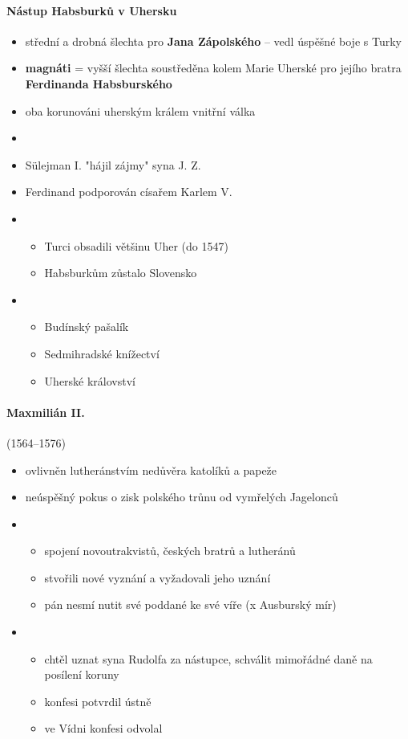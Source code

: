 \paragraph{Nástup Habsburků v Uhersku}
\begin{itemize}
\item střední a drobná šlechta pro \textbf{Jana Zápolského} -- vedl úspěšné boje s Turky
\item \textbf{magnáti} = vyšší šlechta soustředěna kolem Marie Uherské \ra pro jejího bratra \textbf{Ferdinanda Habsburského}
\item oba korunováni uherským králem \ra vnitřní válka
\item {}
\item Sülejman I. "hájil zájmy" syna J. Z.
\item Ferdinand podporován císařem Karlem V.
\item {}
	\begin{itemize}
	\item Turci obsadili většinu Uher (do 1547)
	\item Habsburkům zůstalo Slovensko
	\end{itemize}
\item {}
	\begin{itemize}
	\item Budínský pašalík
	\item Sedmihradské knížectví
	\item Uherské království
	\end{itemize}
\end{itemize}

\paragraph{Maxmilián II.}(1564--1576)
\begin{itemize}
\item ovlivněn lutheránstvím \ra nedůvěra katolíků a papeže 
\item neúspěšný pokus o zisk polského trůnu od vymřelých Jagelonců
\item {}
	\begin{itemize}
	\item spojení novoutrakvistů, českých bratrů a lutheránů
	\item stvořili nové vyznání a vyžadovali jeho uznání
	\item pán nesmí nutit své poddané ke své víře (x Ausburský mír)
	\end{itemize}
\item {}
	\begin{itemize}
	\item chtěl uznat syna Rudolfa za nástupce, schválit mimořádné daně na posílení koruny
	\item konfesi potvrdil ústně
	\item ve Vídni konfesi odvolal
	\end{itemize}
\end{itemize}

